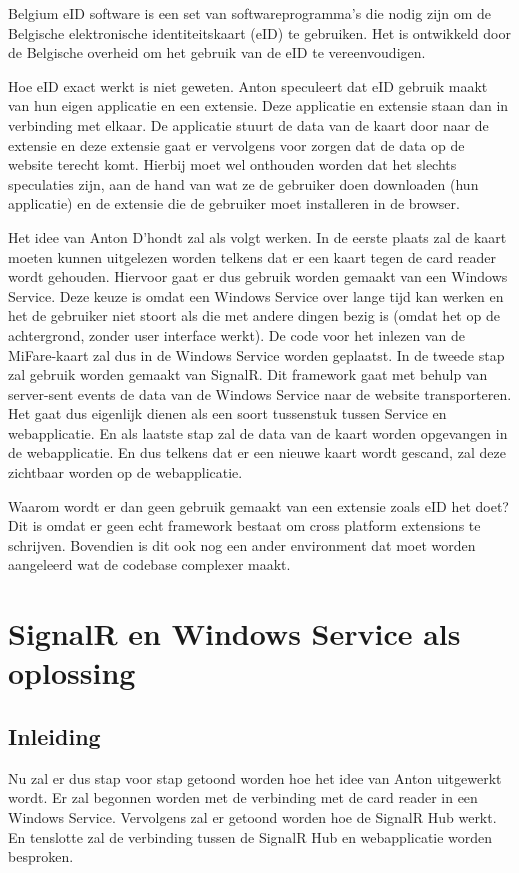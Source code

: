 Belgium eID software is een set van softwareprogramma's die nodig zijn om de Belgische elektronische identiteitskaart (eID) te gebruiken. Het is ontwikkeld door de Belgische overheid om het gebruik van de eID te vereenvoudigen. 

Hoe eID exact werkt is niet geweten. Anton speculeert dat eID gebruik maakt van hun eigen applicatie en een extensie. Deze applicatie en extensie staan dan in verbinding met elkaar. De applicatie stuurt de data van de kaart door naar de extensie en deze extensie gaat er vervolgens voor zorgen dat de data op de website terecht komt. Hierbij moet wel onthouden worden dat het slechts speculaties zijn, aan de hand van wat ze de gebruiker doen downloaden (hun applicatie) en de extensie die de gebruiker moet installeren in de browser. 

Het idee van Anton D'hondt zal als volgt werken. In de eerste plaats zal de kaart moeten kunnen uitgelezen worden telkens dat er een kaart tegen de card reader wordt gehouden. Hiervoor gaat er dus gebruik worden gemaakt van een Windows Service. Deze keuze is omdat een Windows Service over lange tijd kan werken en het de gebruiker niet stoort als die met andere dingen bezig is (omdat het op de achtergrond, zonder user interface werkt). De code voor het inlezen van de MiFare-kaart zal dus in de Windows Service worden geplaatst. In de tweede stap zal gebruik worden gemaakt van SignalR. Dit framework gaat met behulp van server-sent events de data van de Windows Service naar de website transporteren. Het gaat dus eigenlijk dienen als een soort tussenstuk tussen Service en webapplicatie. En als laatste stap zal de data van de kaart worden opgevangen in de webapplicatie. En dus telkens dat er een nieuwe kaart wordt gescand, zal deze zichtbaar worden op de webapplicatie. 

Waarom wordt er dan geen gebruik gemaakt van een extensie zoals eID het doet? Dit is omdat er geen echt framework bestaat om cross platform extensions te schrijven. Bovendien is dit ook nog een ander environment dat moet worden aangeleerd wat de codebase complexer maakt.




\section{SignalR en Windows Service als oplossing}

\subsection{Inleiding}
Nu zal er dus stap voor stap getoond worden hoe het idee van Anton uitgewerkt wordt. Er zal begonnen worden met de verbinding met de card reader in een Windows Service. Vervolgens zal er getoond worden hoe de SignalR Hub werkt. En tenslotte zal de verbinding tussen de SignalR Hub en webapplicatie worden besproken.

